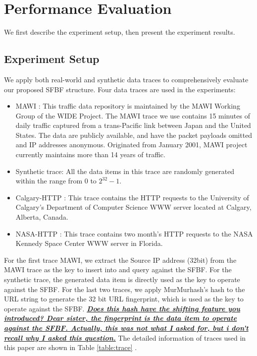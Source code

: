 \documentclass[10pt,journal,letterpaper]{IEEEtran}
\newcommand{\note}[1]{{\sffamily\itshape\bfseries\uline{#1}}}
\begin{document}
\section{Performance Evaluation}
\label{sec:simulation}
We first describe the experiment setup, then present the experiment results.
\subsection{Experiment Setup}
We apply both real-world and synthetic data traces to comprehensively evaluate our proposed SFBF structure. Four data traces are used in the experiments:

\begin{itemize}
  \item MAWI \cite{MAWI}: This traffic data repository is maintained by the MAWI Working Group of the WIDE Project. The MAWI trace we use contains 15 minutes of daily traffic captured from a trans-Pacific link between Japan and the United States. The data are publicly available, and have the packet payloads omitted and IP addresses anonymous. Originated from January 2001, MAWI project currently maintains more than 14 years of traffic.
  \item Synthetic trace: All the data items in this trace are randomly generated within the range from 0 to $2^{32}-1$.
  \item Calgary-HTTP \cite{Calgary}: This trace contains the HTTP requests to the University of Calgary's Department of Computer Science WWW server located at Calgary, Alberta, Canada.
  \item NASA-HTTP \cite{NASA}: This trace contains two month's  HTTP requests to the NASA Kennedy Space Center WWW server in Florida.
\end{itemize}


For the first trace MAWI, we extract the Source IP address (32bit) from the MAWI trace  as the key  to insert into and query against the SFBF. For the synthetic trace, the generated data item is directly used as the key to operate against the SFBF.
For the last two  traces, we apply MurMurhash's hash to the URL string to generate the 32 bit URL fingerprint,  which is used as the key to operate against the SFBF. \note{Does this hash have the shifting feature you introduced? Dear sister, the fingerprint is the data item to operate against the SFBF. Actually, this was not what I asked for, but i don't recall why I asked this question.}
The detailed information of traces used in this paper are shown in Table \ref{table:trace} .
\end{document}
